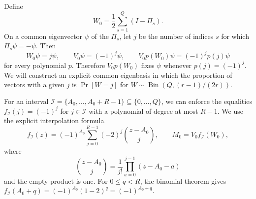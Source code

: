 \documentclass[11pt,reqno]{amsart}
\numberwithin{equation}{section}
\theoremstyle{definition}\newtheorem{definition}[theorem]{Definition}
\theoremstyle{remark}\newtheorem{remark}[theorem]{Remark}
\renewcommand{\le}{\leqslant}
\begin{document}
Define
\begin{equation}\label{eq:swap-weight}
 W_0=\frac12\sum_{s=1}^Q(I-\Pi_s).
\end{equation}
On a common eigenvector $\psi$ of the $\Pi_s$, let $j$ be the number
of indices $s$ for which $\Pi_s\psi=-\psi$. Then
\[
 W_0\psi=j\psi,\qquad V_0\psi=(-1)^j\psi,
 \qquad V_0p(W_0)\psi=(-1)^jp(j)\psi
\]
for every polynomial $p$. Therefore $V_0p(W_0)$ fixes $\psi$ whenever
$p(j)=(-1)^j$. We will construct an explicit common eigenbasis in which
the proportion of vectors with a given $j$ is
$\Pr[W=j]$ for $W\sim\operatorname{Bin}(Q,(r-1)/(2r))$.

For an interval
$\mathcal I=\{A_0,\ldots,A_0+R-1\}\subseteq\{0,\ldots,Q\}$,
we can enforce the equalities $f_{\mathcal I}(j)=(-1)^j$
for $j\in\mathcal I$ with a polynomial of degree at most $R-1$.
We use the explicit interpolation formula
\begin{equation}\label{eq:swap-matrix-definition}
 f_{\mathcal I}(z)=(-1)^{A_0}\sum_{j=0}^{R-1}(-2)^j
                         \binom{z-A_0}{j},
 \qquad M_0=V_0f_{\mathcal I}(W_0),
\end{equation}
where
\[
 \binom{z-A_0}{j}=\frac1{j!}\prod_{a=0}^{j-1}(z-A_0-a)
\]
and the empty product is one. For $0\le q<R$, the binomial theorem gives
$f_{\mathcal I}(A_0+q)=(-1)^{A_0}(1-2)^q=(-1)^{A_0+q}$.
\end{document}
